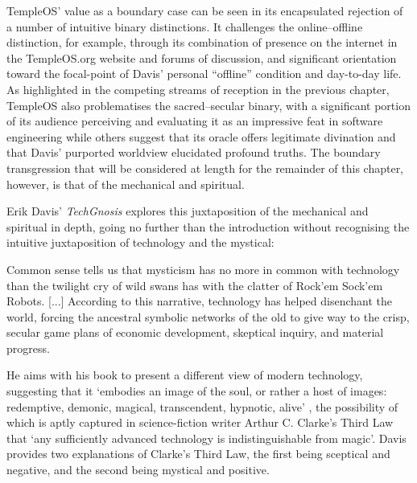 TempleOS' value as a boundary case can be seen in its encapsulated rejection
of a number of intuitive binary distinctions.
It challenges the online--offline distinction, for example, through
its combination of presence on the internet in the TempleOS.org website
and forums of discussion, and significant orientation toward the
focal-point of Davis' personal ``offline'' condition and day-to-day life.
As highlighted in the competing streams of reception in the previous chapter,
TempleOS also problematises the sacred--secular binary,
with a significant portion of its audience perceiving and evaluating it
as an impressive feat in software engineering while others suggest
that its oracle offers legitimate divination and that Davis'
purported worldview elucidated profound truths.
The boundary transgression that will be considered at length for the remainder
of this chapter, however, is that of the mechanical and spiritual.

Erik Davis' \parencite*[2--3]{Davis98} \textit{TechGnosis} explores this
juxtaposition of the mechanical and spiritual in depth,
going no further than the introduction without recognising the intuitive
juxtaposition of technology and the mystical:
\begin{displayquote}
  Common sense tells us that mysticism has no more in common with technology
  than the twilight cry of wild swans has with
  the clatter of Rock'em Sock'em Robots. [...]
  According to this narrative, technology has helped disenchant the world,
  forcing the ancestral symbolic networks of the old to give way to the crisp,
  secular game plans of economic development, skeptical inquiry,
  and material progress.
\end{displayquote}
He aims with his book to present a different view of modern technology,
suggesting that it `embodies an image of the soul, or rather a host of images:
redemptive, demonic, magical, transcendent, hypnotic, alive'
\parencite[9]{Davis98}, the possibility of which is aptly captured in
science-fiction writer Arthur C. Clarke's \parencite*[21]{Clarke73} Third Law
that `any sufficiently advanced technology is indistinguishable from magic'.
Davis provides two explanations of Clarke's Third Law, the first being
sceptical and negative, and the second being mystical and positive.


